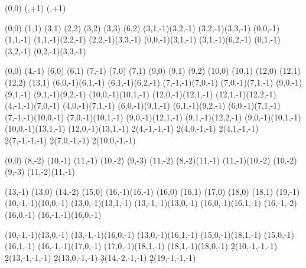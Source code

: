 \documentclass{article}
\begin{document}
\NewSseqGroup\tower {} {%
    \class(0,0)
    \class(\lastx,\lasty+1)
    \class(\lastx,\lasty+1)
}

\NewSseqGroup\towergroup {} {%
    \tower(0,0)
    \class(1,1)
    \class(3,1)
    \class(2,2)
    \class(3,2)
    \class(3,3)
    \class(6,2)
    \structline(3,1,-1)(3,2,-1)
    \structline(3,2,-1)(3,3,-1)
    \structline(0,0,-1)(1,1,-1)
    \structline(1,1,-1)(2,2,-1)
    \structline(2,2,-1)(3,3,-1)
    \structline(0,0,-1)(3,1,-1)
    \structline(3,1,-1)(6,2,-1)
    \structline(0,1,-1)(3,2,-1)
    \structline(0,2,-1)(3,3,-1)
}


\NewSseqGroup\towergroupa {} {%
    \towergroup(0,0)
    \tower(4,-1)
%
    \class(6,0)
    \class(6,1)
    \class(7,-1)
    \class(7,0)
    \class(7,1)
    \class(9,0)
    \class(9,1)
    \class(9,2)
    \class(10,0)
    \class(10,1)
    \class(12,0)
    \class(12,1)
    \class(12,2)
    \class(13,1)
    \structline(6,0,-1)(6,1,-1)
    \structline(6,1,-1)(6,2,-1)
    \structline(7,-1,-1)(7,0,-1)
    \structline(7,0,-1)(7,1,-1)
    \structline(9,0,-1)(9,1,-1)
    \structline(9,1,-1)(9,2,-1)
    \structline(10,0,-1)(10,1,-1)
    \structline(12,0,-1)(12,1,-1)
    \structline(12,1,-1)(12,2,-1)
%
    \structline(4,-1,-1)(7,0,-1)
    \structline(4,0,-1)(7,1,-1)
    \structline(6,0,-1)(9,1,-1)
    \structline(6,1,-1)(9,2,-1)
    \structline(6,0,-1)(7,1,-1)
    \structline(7,-1,-1)(10,0,-1)
    \structline(7,0,-1)(10,1,-1)
    \structline(9,0,-1)(12,1,-1)
    \structline(9,1,-1)(12,2,-1)
    \structline(9,0,-1)(10,1,-1)
    \structline(10,0,-1)(13,1,-1)
    \structline(12,0,-1)(13,1,-1)
%
    \d2(4,-1,-1,-1)
    \d2(4,0,-1,-1)
    \d2(4,1,-1,-1)
    \d2(7,-1,-1,-1)
    \d2(7,0,-1,-1)
    \d2(10,0,-1,-1)
}

\NewSseqGroup\towergroupb {} {%
    \towergroupa(0,0)
    \tower(8,-2)
    \class(10,-1)
    \class(11,-1)
    \class(10,-2)
    \class(9,-3)
    \class(11,-2)
    \structline(8,-2)(11,-1)
    \structline(11,-1)(10,-2)
    \structline(10,-2)(9,-3)
    \structline(11,-2)(11,-1)

    \class(13,-1)
    \class(13,0)
    \class(14,-2)
    \class(15,0)
    \class(16,-1)\class(16,-1)
    \class(16,0)
    \class(16,1)
    \class(17,0)
    \class(18,0)
    \class(18,1)
    \class(19,-1)
    \structline(10,-1,-1)(10,0,-1)
    \structline(13,0,-1)(13,1,-1)
    \structline(13,-1,-1)(13,0,-1)
    \structline(16,0,-1)(16,1,-1)
    \structline(16,-1,-2)(16,0,-1)
    \structline(16,-1,-1)(16,0,-1)

    \structline(10,-1,-1)(13,0,-1)
    \structline(13,-1,-1)(16,0,-1)
    \structline(13,0,-1)(16,1,-1)
    \structline(15,0,-1)(18,1,-1)
    \structline(15,0,-1)(16,1,-1)
    \structline(16,-1,-1)(17,0,-1)
    \structline(17,0,-1)(18,1,-1)
    \structline(18,1,-1)(18,0,-1)
    \d2(10,-1,-1,-1)
    \d2(13,-1,-1,-1)
    \d2(13,0,-1,-1)
    \d3(14,-2,-1,-1)
    \d2(19,-1,-1,-1)
}
\end{document}
